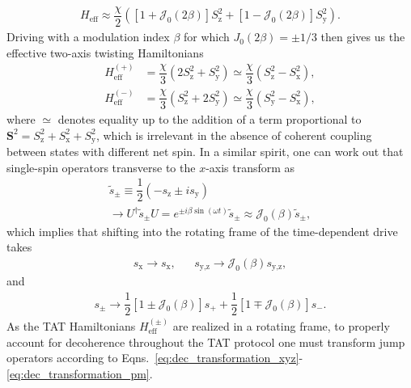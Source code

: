 \documentclass[aps,prx,superscriptaddress,twocolumn]{revtex4-2}
\renewcommand{\t}{\text} %
\newcommand{\f}[2]{\dfrac{#1}{#2}} %
\newcommand{\p}[1]{\left(#1\right)} %
\renewcommand{\sp}[1]{\left[#1\right]} %
\renewcommand{\v}{\bm} %
\newcommand{\J}{\mathcal{J}}
\newcommand{\z}{\text{z}}
\newcommand{\x}{\text{x}}
\newcommand{\y}{\text{y}}
\begin{document}
\begin{align}
  H_{\t{eff}}
  \approx \f{\chi}{2} \p{\sp{1+\J_0\p{2\beta}} S_\z^2
  + \sp{1-\J_0\p{2\beta}} S_\y^2}.
\end{align}
Driving with a modulation index $\beta$ for which $J_0\p{2\beta}=\pm1/3$ then gives us the effective two-axis twisting Hamiltonians
\begin{align}
  H_{\t{eff}}^{(+)}
  &= \f{\chi}{3} \p{2 S_\z^2 + S_\y^2}
  \simeq \f{\chi}{3} \p{S_\z^2 - S_\x^2}, \\
  H_{\t{eff}}^{(-)}
  &= \f{\chi}{3} \p{S_\z^2 + 2 S_\y^2}
  \simeq \f{\chi}{3} \p{S_\y^2 - S_\x^2},
\end{align}
where $\simeq$ denotes equality up to the addition of a term proportional to $\v S^2=S_\z^2+S_\x^2+S_\y^2$, which is irrelevant in the absence of coherent coupling between states with different net spin.
In a similar spirit, one can work out that single-spin operators transverse to the $x$-axis transform as
\begin{multline}
  \tilde s_\pm
  \equiv \f12\p{-s_\z\pm i s_\y} \\
  \to U^\dag \tilde s_\pm U
  = e^{\pm i\beta\sin\p{\omega t}} \tilde s_\pm
  \approx \J_0\p{\beta} \tilde s_\pm,
\end{multline}
which implies that shifting into the rotating frame of the time-dependent drive takes
\begin{align}
  s_\x \to s_\x,
  &&
  s_{\y,\z} \to \J_0\p{\beta} s_{\y,\z},
  \label{eq:dec_transformation_xyz}
\end{align}
and
\begin{align}
  s_\pm
  \to \f12\sp{1 \pm \J_0\p{\beta}} s_+
  + \f12\sp{1 \mp \J_0\p{\beta}} s_-.
  \label{eq:dec_transformation_pm}
\end{align}
As the TAT Hamiltonians $H_{\t{eff}}^{(\pm)}$ are realized in a rotating frame, to properly account for decoherence throughout the TAT protocol one must transform jump operators according to Eqns.~\eqref{eq:dec_transformation_xyz}-\eqref{eq:dec_transformation_pm}.
\end{document}
